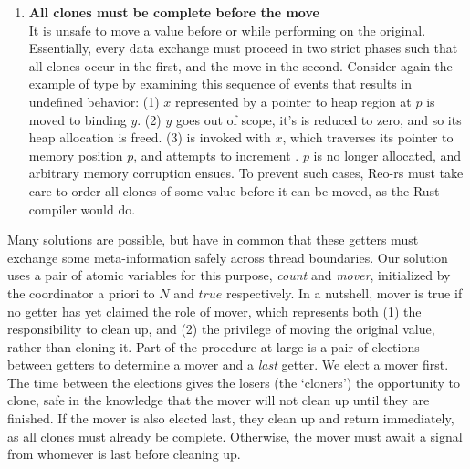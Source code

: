 \begin{enumerate}
	\item \textbf{All clones must be complete before the move}\\
	It is unsafe to move a value before or while performing  on the original. Essentially, every data exchange must proceed in two strict phases such that all clones occur in the first, and the move in the second.
	Consider again the example of type  by examining this sequence of events that results in undefined behavior: (1)  $x$ represented by a pointer to heap region at $p$ is moved to binding $y$. (2) $y$ goes out of scope, it's  is reduced to zero, and so its heap allocation is freed. (3)  is invoked with $x$, which traverses its pointer to memory position $p$, and attempts to increment . $p$ is no longer allocated, and arbitrary memory corruption ensues. To prevent such cases, Reo-rs must take care to order all clones of some value before it can be moved, as the Rust compiler would do.
\end{enumerate}

Many solutions are possible, but have in common that these getters must exchange some meta-information safely across thread boundaries. Our solution uses a pair of atomic variables for this purpose, \textit{count} and \textit{mover}, initialized by the coordinator a priori to $N$ and $true$ respectively. In a nutshell, mover is true if no getter has yet claimed the role of mover, which represents both (1) the responsibility to clean up, and (2) the privilege of moving the original value, rather than cloning it. Part of the procedure at large is a pair of elections between getters to determine a mover and a \textit{last} getter. We elect a mover first. The time between the elections gives the losers (the `cloners') the opportunity to clone, safe in the knowledge that the mover will not clean up until they are finished. If the mover is also elected last, they clean up and return immediately, as all clones must already be complete. Otherwise, the mover must await a signal from whomever is last before cleaning up.


